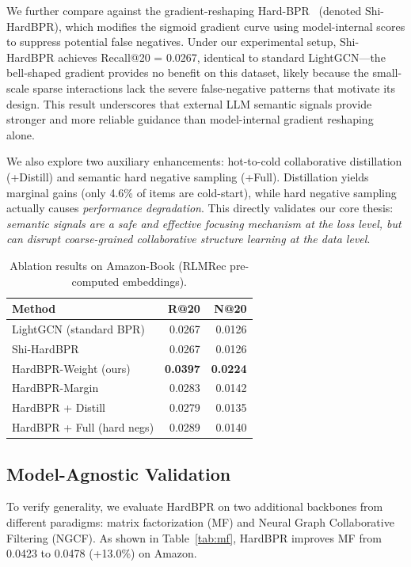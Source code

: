 \documentclass[11pt,a4paper]{article}
\begin{document}
We further compare against the gradient-reshaping Hard-BPR~\cite{Shi2024HardBPR} (denoted Shi-HardBPR), which modifies the sigmoid gradient curve using model-internal scores to suppress potential false negatives. Under our experimental setup, Shi-HardBPR achieves Recall@20 = 0.0267, identical to standard LightGCN---the bell-shaped gradient provides no benefit on this dataset, likely because the small-scale sparse interactions lack the severe false-negative patterns that motivate its design. This result underscores that external LLM semantic signals provide stronger and more reliable guidance than model-internal gradient reshaping alone.

We also explore two auxiliary enhancements: hot-to-cold collaborative distillation (+Distill) and semantic hard negative sampling (+Full). Distillation yields marginal gains (only 4.6\% of items are cold-start), while hard negative sampling actually causes \emph{performance degradation}. This directly validates our core thesis: \emph{semantic signals are a safe and effective focusing mechanism at the loss level, but can disrupt coarse-grained collaborative structure learning at the data level}.

\begin{table}[ht]
    \centering
    \caption{Ablation results on Amazon-Book (RLMRec pre-computed embeddings).}
    \label{tab:ablation}
    \begin{tabular}{lrr}
        \toprule
        Method & R@20 & N@20 \\
        \midrule
        LightGCN (standard BPR) & 0.0267 & 0.0126 \\
        Shi-HardBPR~\cite{Shi2024HardBPR} & 0.0267 & 0.0126 \\
        HardBPR-Weight (ours) & \textbf{0.0397} & \textbf{0.0224} \\
        HardBPR-Margin & 0.0283 & 0.0142 \\
        HardBPR + Distill & 0.0279 & 0.0135 \\
        HardBPR + Full (hard negs) & 0.0289 & 0.0140 \\
        \bottomrule
    \end{tabular}
\end{table}

\subsection{Model-Agnostic Validation}

To verify generality, we evaluate HardBPR on two additional backbones from different paradigms: matrix factorization (MF) and Neural Graph Collaborative Filtering (NGCF). As shown in Table~\ref{tab:mf}, HardBPR improves MF from 0.0423 to 0.0478 (+13.0\%) on Amazon.
\end{document}
